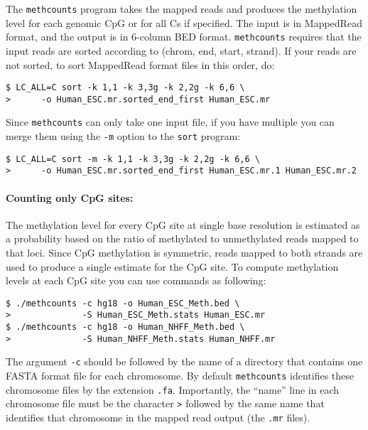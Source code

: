 \documentclass[10pt]{article}
\newcommand{\prog}[1]{\texttt{#1}}
\newcommand{\fn}[1]{\texttt{#1}}
\newcommand{\lit}[1]{\texttt{#1}}
\newcommand{\op}[1]{\texttt{#1}}
\begin{document}
The \prog{methcounts} program takes the mapped reads and produces the
methylation level for each genomic CpG or for all Cs if specified.
The input is in MappedRead format, and the output is in 6-column BED
format. \prog{methcounts} requires that the input reads are sorted
according to (chrom, end, start, strand). If your reads are not
sorted, to sort MappedRead format files in this order, do:
\begin{verbatim}
$ LC_ALL=C sort -k 1,1 -k 3,3g -k 2,2g -k 6,6 \
>      -o Human_ESC.mr.sorted_end_first Human_ESC.mr
\end{verbatim}
Since \prog{methcounts} can only take one input file, if you have
multiple you can merge them using the \op{-m} option to the
\prog{sort} program:
\begin{verbatim}
$ LC_ALL=C sort -m -k 1,1 -k 3,3g -k 2,2g -k 6,6 \
>      -o Human_ESC.mr.sorted_end_first Human_ESC.mr.1 Human_ESC.mr.2
\end{verbatim}

\paragraph{Counting only CpG sites:}
The methylation level for every CpG site at single base resolution is
estimated as a probability based on the ratio of methylated to
unmethylated reads mapped to that loci. Since CpG methylation is
symmetric, reads mapped to both strands are used to produce a single
estimate for the CpG site. To compute methylation levels at each CpG
site you can use commands as following:
\begin{verbatim}
$ ./methcounts -c hg18 -o Human_ESC_Meth.bed \
>              -S Human_ESC_Meth.stats Human_ESC.mr
$ ./methcounts -c hg18 -o Human_NHFF_Meth.bed \
>              -S Human_NHFF_Meth.stats Human_NHFF.mr
\end{verbatim}
The argument \op{-c} should be followed by the name of a directory
that contains one FASTA format file for each chromosome. By default
\prog{methcounts} identifies these chromosome files by the extension
\fn{.fa}. Importantly, the ``name'' line in each chromosome file must
be the character \lit{>} followed by the same name that identifies
that chromosome in the mapped read output (the \fn{.mr} files).
\end{document}
